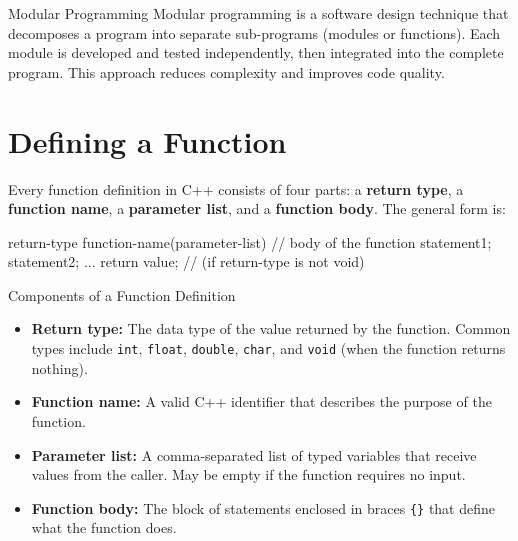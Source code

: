 \begin{conceptbox}{Modular Programming}
Modular programming is a software design technique that decomposes a program
into separate sub-programs (modules or functions). Each module is developed
and tested independently, then integrated into the complete program. This
approach reduces complexity and improves code quality.
\end{conceptbox}

\section{Defining a Function}
\label{sec:defining-function}

Every function definition in C++ consists of four parts: a \textbf{return type},
a \textbf{function name}, a \textbf{parameter list}, and a \textbf{function
body}. The general form is:

\begin{cppcode}
return-type function-name(parameter-list)
{
    // body of the function
    statement1;
    statement2;
    ...
    return value;  // (if return-type is not void)
}
\end{cppcode}

\begin{importantbox}{Components of a Function Definition}
\begin{itemize}
    \item \textbf{Return type:} The data type of the value returned by the
          function. Common types include \texttt{int}, \texttt{float},
          \texttt{double}, \texttt{char}, and \texttt{void} (when the function
          returns nothing).
    \item \textbf{Function name:} A valid C++ identifier that describes the
          purpose of the function.
    \item \textbf{Parameter list:} A comma-separated list of typed variables
          that receive values from the caller. May be empty if the function
          requires no input.
    \item \textbf{Function body:} The block of statements enclosed in braces
          \texttt{\{\}} that define what the function does.
\end{itemize}
\end{importantbox}

